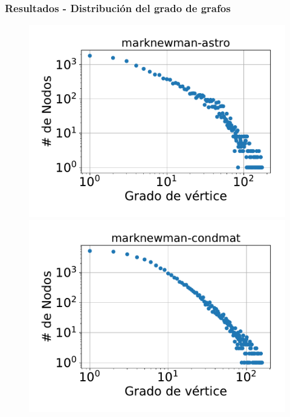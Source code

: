 \begin{frame}
\frametitle{Resultados - Distribución del grado de grafos}

\begin{figure}
    \centering
    	\begin{minipage}{1\textwidth}
    		\centering
    		\begin{minipage}{0.45\textwidth}
    			\centering
    			\includegraphics[width=1\linewidth]{../img/grades/marknewman-astro.pdf}
    		\end{minipage}
    		\begin{minipage}{0.45\textwidth}
    			\centering
    			\includegraphics[width=1\linewidth]{../img/grades/marknewman-condmat.pdf}
    		\end{minipage}  		
    	\end{minipage}
    	

\end{figure}
\end{frame}
